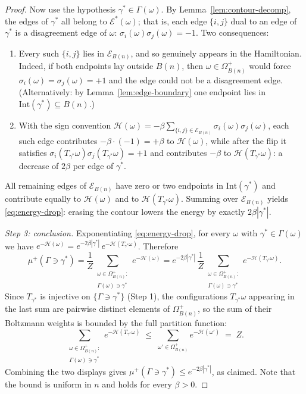 \documentclass[11pt]{article}
\theoremstyle{plain}
\theoremstyle{definition}
\theoremstyle{remark}
\newcommand{\sg}{\sigma}
\newcommand{\Ham}{\mathcal{H}}
\newcommand{\Eset}{\mathscr{E}}
\newcommand{\Intr}{\mathrm{Int}}    %
\newcommand{\Gam}{\Gamma}           %
\newcommand{\dedges}{\mathscr{E}^*} %
\begin{document}
\begin{proof}
Now use the hypothesis $\gamma^*\in\Gam(\omega)$. By
Lemma~\ref{lem:contour-decomp}, the edges of $\gamma^*$ all belong to
$\dedges(\omega)$; that is, each edge $\{i,j\}$ dual to an edge of $\gamma^*$
is a disagreement edge of $\omega$:
$\sg_i(\omega)\sg_j(\omega)=-1$. Two consequences:
\begin{enumerate}
\item Every such $\{i,j\}$ lies in $\Eset_{B(n)}$, and so genuinely appears
  in the Hamiltonian. Indeed, if both endpoints lay outside $B(n)$, then
  $\omega\in\Omega^{+}_{B(n)}$ would force
  $\sg_i(\omega)=\sg_j(\omega)=+1$ and the edge could not be a disagreement
  edge. (Alternatively: by Lemma~\ref{lem:edge-boundary} one endpoint lies in
  $\Intr(\gamma^*)\subseteq B(n)$.)
\item With the sign convention
  $\Ham(\omega)=-\beta\sum_{\{i,j\}\in\Eset_{B(n)}}\sg_i(\omega)\sg_j(\omega)$,
  each such edge contributes $-\beta\cdot(-1)=+\beta$ to $\Ham(\omega)$,
  while after the flip it satisfies
  $\sg_i(T_{\gamma^*}\omega)\sg_j(T_{\gamma^*}\omega)=+1$ and contributes
  $-\beta$ to $\Ham(T_{\gamma^*}\omega)$: a decrease of $2\beta$ per edge of
  $\gamma^*$.
\end{enumerate}
All remaining edges of $\Eset_{B(n)}$ have zero or two endpoints in
$\Intr(\gamma^*)$ and contribute equally to $\Ham(\omega)$ and to
$\Ham(T_{\gamma^*}\omega)$. Summing over $\Eset_{B(n)}$ yields
\eqref{eq:energy-drop}: erasing the contour lowers the energy by exactly
$2\beta|\gamma^*|$.

\medskip\noindent\emph{Step 3: conclusion.}
Exponentiating \eqref{eq:energy-drop}, for every $\omega$ with
$\gamma^*\in\Gam(\omega)$ we have
$e^{-\Ham(\omega)}=e^{-2\beta|\gamma^*|}\,e^{-\Ham(T_{\gamma^*}\omega)}$.
Therefore
\[
  \mu^{+}(\Gam\ni\gamma^*)
  =\frac{1}{Z}\sum_{\substack{\omega\in\Omega^{+}_{B(n)}:\\ \Gam(\omega)\ni\gamma^*}}
     e^{-\Ham(\omega)}
  =e^{-2\beta|\gamma^*|}\,
   \frac{1}{Z}\sum_{\substack{\omega\in\Omega^{+}_{B(n)}:\\ \Gam(\omega)\ni\gamma^*}}
     e^{-\Ham(T_{\gamma^*}\omega)} .
\]
Since $T_{\gamma^*}$ is injective on $\{\Gam\ni\gamma^*\}$ (Step 1), the
configurations $T_{\gamma^*}\omega$ appearing in the last sum are pairwise
distinct elements of $\Omega^{+}_{B(n)}$, so the sum of their Boltzmann
weights is bounded by the full partition function:
\[
  \sum_{\substack{\omega\in\Omega^{+}_{B(n)}:\\ \Gam(\omega)\ni\gamma^*}}
     e^{-\Ham(T_{\gamma^*}\omega)}
  \;\le\;
  \sum_{\omega'\in\Omega^{+}_{B(n)}} e^{-\Ham(\omega')}
  \;=\; Z .
\]
Combining the two displays gives
$\mu^{+}(\Gam\ni\gamma^*)\le e^{-2\beta|\gamma^*|}$, as claimed. Note that
the bound is uniform in $n$ and holds for every $\beta>0$.
\end{proof}
\end{document}
